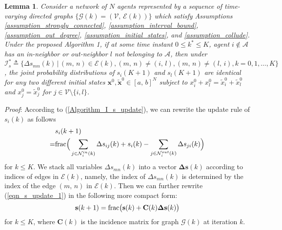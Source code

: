 \documentclass{IEEEtran}
\newtheorem{Lemma}{Lemma}
\begin{document}
\begin{Lemma}\label{lemma_privacy}
	Consider a network of $N$ agents represented by a sequence of time-varying directed graphs $\{\mathcal{G}(k)=(\mathcal{V}, \, \mathcal{E}(k))\}$ which satisfy Assumptions \ref{assumption_strongly_connected}, \ref{assumption_interval_bound}, \ref{assumption_out_degree}, \ref{assumption_initial_states}, and \ref{assumption_collude}. Under the proposed Algorithm 1, if at some time instant $0\leq k^* \leq K$, agent $i\notin \mathcal{A}$ has an in-neighbor or out-neighbor $l$ not belonging to $\mathcal{A}$, then under $\mathcal{I}_s^* \triangleq \{\Delta s_{mn}(k) \, | \, (m,\,n) \in \mathcal{E}(k), (m,\,n)\neq (i,\,l), (m,\,n)\neq (l,\,i), k=0,1,\ldots,K\}$, the joint probability distributions of $s_i(K+1)$ and $s_l(K+1)$ are identical for any two different initial states $\mathbf{x}^0, \tilde{\mathbf{x}}^0 \in [a, \, b]^N$ subject to $x_i^0+x_l^0=\tilde{x}_i^0 + \tilde{x}_l^0$ and $x_j^0=\tilde{x}_j^0$ for $j\in \mathcal{V}\setminus \{i,l\}$.
\end{Lemma}

{\it Proof}: According to (\ref{Algorithm_I_s_update}), we can rewrite the update rule of $s_i(k)$ as follows
\begin{equation}\label{eqn_s_update_1} 
	\begin{aligned}
		& s_i(k+1) \\
		= & {\rm frac}\Big(\sum_{j\in \mathcal{N}_i^{in}(k)} \Delta s_{ij}(k) + s_i(k) - \sum_{j\in \mathcal{N}_i^{out}(k)} \Delta s_{ji}(k) \Big)
	\end{aligned}
\end{equation}
for $k \leq K$. We stack all variables $\Delta s_{mn}(k)$ into a vector $\boldsymbol{\Delta}\mathbf{s}(k)$ according to indices of edges in $\mathcal{E}(k)$, namely, the index of $\Delta s_{mn}(k)$ is determined by the index of the edge $(m, \, n)$ in $\mathcal{E}(k)$. Then we can further rewrite (\ref{eqn_s_update_1}) in the following more compact form:
\begin{equation}\label{eqn_s_update_2}
	\begin{aligned}
		\mathbf{s}(k+1)={\rm frac}\big(\mathbf{s}(k)+\mathbf{C}(k) \boldsymbol{\Delta}\mathbf{s}(k)\big)
	\end{aligned} 
\end{equation}
for $k \leq K$, where $\mathbf{C}(k)$ is the incidence matrix for graph $\mathcal{G}(k)$ at iteration $k$.
\end{document}
